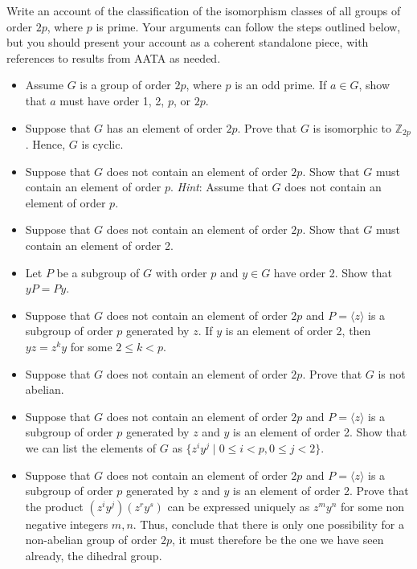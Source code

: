 \documentclass[oneside,10pt]{amsart}
\begin{document}
Write an account of the classification of the isomorphism classes of all groups of order $2p$, where $p$ is prime. Your arguments can follow the steps outlined below, but you should present your account as a coherent standalone piece, with references to results from AATA as needed.
\begin{itemize}
\item\hypertarget{li-370}{}Assume \(G\) is a group of order \(2p\), where \(p\) is an odd prime.  If \(a \in G\), show that \(a\) must have order 1, 2, \(p\), or \(2p\).%
\item\hypertarget{li-371}{}Suppose that \(G\) has an element of order \(2p\).  Prove that \(G\) is isomorphic to \({\mathbb Z}_{2p}\).  Hence, \(G\) is cyclic.%
\item\hypertarget{li-372}{}Suppose that \(G\) does not contain an element of order \(2p\).  Show that \(G\) must contain an element of order \(p\).  {\em Hint}:  Assume that \(G\) does not contain an element of order \(p\).%
\item\hypertarget{li-373}{}Suppose that \(G\) does not contain an element of order \(2p\).  Show that \(G\) must contain an element of order 2.%
\item\hypertarget{li-374}{}Let \(P\) be a subgroup of \(G\) with order \(p\) and \(y \in G\) have order 2.  Show that \(yP = Py\).%
\item\hypertarget{li-375}{}Suppose that \(G\) does not contain an element of order \(2p\) and \(P = \langle z \rangle\) is a subgroup of order \(p\) generated by \(z\).  If \(y\) is an element of order 2, then \(yz = z^ky\) for some \(2 \leq k < p\).%
\item\hypertarget{li-376}{}Suppose that \(G\) does not contain an element of order \(2p\).  Prove that \(G\) is not abelian.%
\item\hypertarget{li-377}{}Suppose that \(G\) does not contain an element of order \(2p\) and \(P = \langle z \rangle\) is a subgroup of order \(p\) generated by \(z\) and \(y\) is an element of order 2. Show that we can list the elements of \(G\) as \(\{z^iy^j\mid 0\leq i < p, 0\leq j < 2\}\).%
\item\hypertarget{li-378}{}Suppose that \(G\) does not contain an element of order \(2p\) and \(P = \langle z \rangle\) is a subgroup of order \(p\) generated by \(z\) and \(y\) is an element of order 2.  Prove that the product \((z^iy^j)(z^ry^s)\) can be expressed uniquely as \(z^m y^n\) for some non negative integers \(m, n\).  Thus, conclude that there is only one possibility for a non-abelian group of order \(2p\), it must therefore be the one we have seen already, the dihedral group.%
\end{itemize}
\end{document}
